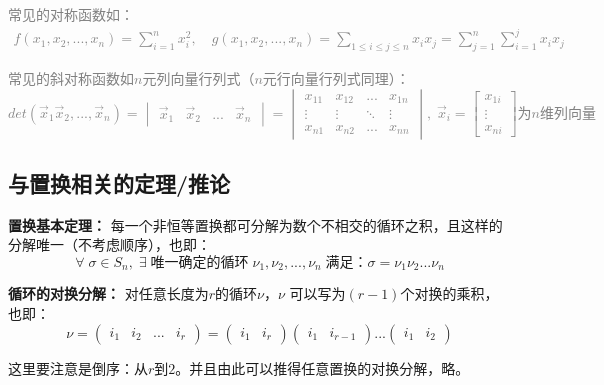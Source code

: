 \documentclass[zihao=-4,UTF8]{report}
\begin{document}
\textcolor{gray}{
常见的对称函数如：
\begin{align*}
    f(x_{1},x_{2},...,x_{n})=\sum_{i=1}^{n}x_{i}^{2},\quad g(x_{1},x_{2},...,x_{n})=\sum_{1\le i\le j\le n}x_{i}x_{j}=\sum_{j=1}^{n}\sum_{i=1}^{j}x_{i}x_{j}
\end{align*}
}\par
\textcolor{gray}{
常见的斜对称函数如$n$元列向量行列式（$n$元行向量行列式同理）：
    \begin{equation*}
        det(\vec{x}_{1}\vec{x}_{2},...,\vec{x}_{n})=
        \begin{vmatrix}
        \vec{x}_{1}&  \vec{x}_{2}& ... &\vec{x}_{n}
        \end{vmatrix}=
        \begin{vmatrix}
            x_{11} & x_{12} & ... & x_{1n}\\
            \vdots &  \vdots & \ddots  & \vdots \\
            x_{n1} & x_{n2} & ... & x_{nn}
        \end{vmatrix},\;
    \vec{x}_{i}=
    \begin{bmatrix}
        x_{1i}\\
        \vdots\\
        x_{ni}
    \end{bmatrix}\text{为}n\text{维列向量}
    \end{equation*}
}


\subsection{与置换相关的定理/推论}

\textbf{置换基本定理：}
每一个非恒等置换都可分解为数个不相交的循环之积，且这样的分解唯一（不考虑顺序），也即：
\begin{equation*}
    \forall \; \sigma \in S_{n},\; \exists \; \text{唯一确定的循环}\;{\nu_{1},\nu_{2},...,\nu_{n}} \;\text{满足：}\sigma=\nu_{1}\nu_{2}...\nu_{n}
\end{equation*}

\textbf{循环的对换分解：}
对任意长度为$r$的循环$\nu$，$\nu$ 可以写为$(r-1)$个对换的乘积，也即：
\begin{equation*}
    \nu=\begin{pmatrix}
        i_{1}&i_{2}&...&i_{r}
    \end{pmatrix}
    =\begin{pmatrix}i_{1}&i_{r}\end{pmatrix}\begin{pmatrix}i_{1}&i_{r-1}\end{pmatrix}...\begin{pmatrix}i_{1}&i_{2}\end{pmatrix}
\end{equation*}\par
这里要注意是倒序：从$r$到$2$。并且由此可以推得任意置换的对换分解，略。
\end{document}
